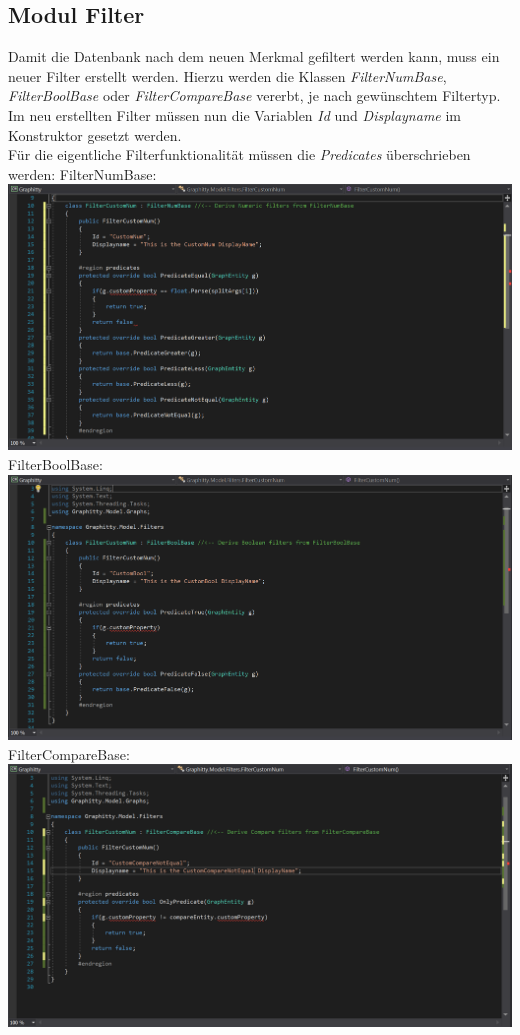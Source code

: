 \documentclass[13pt]{scrreprt}
\begin{document}
\subsection{Modul Filter}
Damit die Datenbank nach dem neuen Merkmal gefiltert werden kann, muss ein neuer Filter erstellt werden. Hierzu werden die Klassen \textit{FilterNumBase}, \textit{FilterBoolBase} oder \textit{FilterCompareBase} vererbt, je nach gewünschtem Filtertyp.\\
Im neu erstellten Filter müssen nun die Variablen \textit{Id} und \textit{Displayname} im Konstruktor gesetzt werden.\\
Für die eigentliche Filterfunktionalität müssen die \textit{Predicates} überschrieben werden:
\newpage
FilterNumBase:\\
\includegraphics[scale=0.5,center]{FilterNumBase.PNG}
FilterBoolBase:\\
\includegraphics[scale=0.5,center]{FilterBoolBase.PNG}
\newpage
FilterCompareBase:\\
\includegraphics[scale=0.5,center]{FilterCompareBase.PNG}\\
\end{document}
